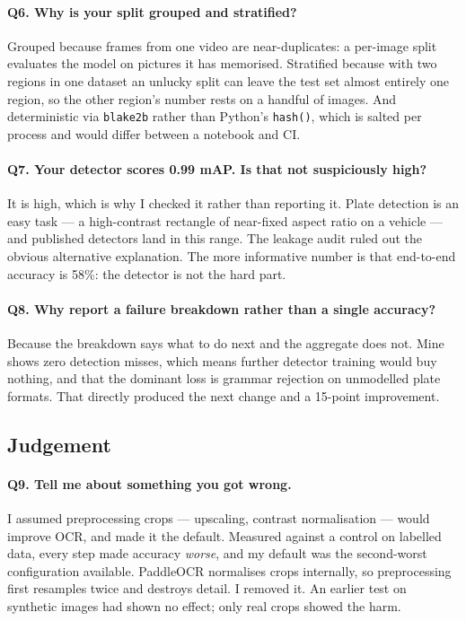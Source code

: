\documentclass[11pt,a4paper]{article}
\begin{document}
\paragraph{Q6. Why is your split grouped and stratified?}
Grouped because frames from one video are near-duplicates: a per-image split
evaluates the model on pictures it has memorised. Stratified because with two
regions in one dataset an unlucky split can leave the test set almost entirely
one region, so the other region's number rests on a handful of images. And
deterministic via \texttt{blake2b} rather than Python's \texttt{hash()}, which is
salted per process and would differ between a notebook and CI.

\paragraph{Q7. Your detector scores 0.99 mAP. Is that not suspiciously high?}
It is high, which is why I checked it rather than reporting it. Plate detection is
an easy task --- a high-contrast rectangle of near-fixed aspect ratio on a vehicle
--- and published detectors land in this range. The leakage audit ruled out the
obvious alternative explanation. The more informative number is that end-to-end
accuracy is 58\%: the detector is not the hard part.

\paragraph{Q8. Why report a failure breakdown rather than a single accuracy?}
Because the breakdown says what to do next and the aggregate does not. Mine shows
zero detection misses, which means further detector training would buy nothing,
and that the dominant loss is grammar rejection on unmodelled plate formats. That
directly produced the next change and a 15-point improvement.

\subsection*{Judgement}

\paragraph{Q9. Tell me about something you got wrong.}
I assumed preprocessing crops --- upscaling, contrast normalisation --- would
improve OCR, and made it the default. Measured against a control on labelled
data, every step made accuracy \emph{worse}, and my default was the second-worst
configuration available. PaddleOCR normalises crops internally, so preprocessing
first resamples twice and destroys detail. I removed it. An earlier test on
synthetic images had shown no effect; only real crops showed the harm.
\end{document}
